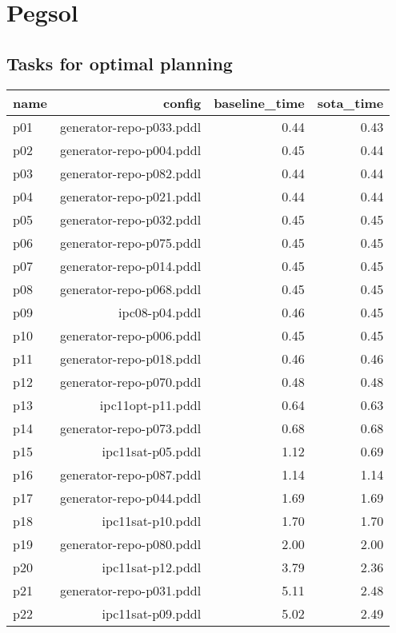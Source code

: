 \documentclass{article}
\begin{document}
                \newpage \section{Pegsol}
                    \subsection*{Tasks for optimal planning}
                    
                            \begin{center}
                            \scriptsize
                            \begin{tabular}{@{}l|r|r|r@{}}
                            name & config & baseline\_time & sota\_time\\\midrule
                              p01& generator-repo-p033.pddl&0.44&0.43\\
  p02& generator-repo-p004.pddl&0.45&0.44\\
  p03& generator-repo-p082.pddl&0.44&0.44\\
  p04& generator-repo-p021.pddl&0.44&0.44\\
  p05& generator-repo-p032.pddl&0.45&0.45\\
  p06& generator-repo-p075.pddl&0.45&0.45\\
  p07& generator-repo-p014.pddl&0.45&0.45\\
  p08& generator-repo-p068.pddl&0.45&0.45\\
  p09& ipc08-p04.pddl&0.46&0.45\\
  p10& generator-repo-p006.pddl&0.45&0.45\\
  p11& generator-repo-p018.pddl&0.46&0.46\\
  p12& generator-repo-p070.pddl&0.48&0.48\\
  p13& ipc11opt-p11.pddl&0.64&0.63\\
  p14& generator-repo-p073.pddl&0.68&0.68\\
  p15& ipc11sat-p05.pddl&1.12&0.69\\
  p16& generator-repo-p087.pddl&1.14&1.14\\
  p17& generator-repo-p044.pddl&1.69&1.69\\
  p18& ipc11sat-p10.pddl&1.70&1.70\\
  p19& generator-repo-p080.pddl&2.00&2.00\\
  p20& ipc11sat-p12.pddl&3.79&2.36\\
  p21& generator-repo-p031.pddl&5.11&2.48\\
  p22& ipc11sat-p09.pddl&5.02&2.49\\

\end{tabular}
\end{center}
\end{document}
